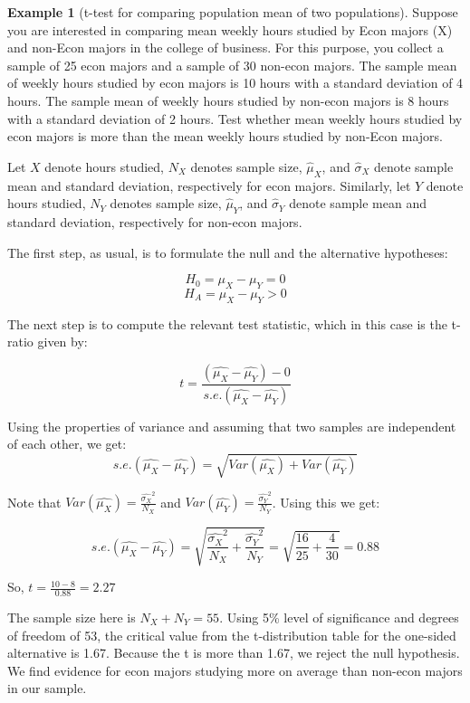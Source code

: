 \documentclass[
]{book}
\theoremstyle{definition}
\theoremstyle{definition}
\newtheorem{example}{Example}[chapter]
\theoremstyle{definition}
\theoremstyle{definition}
\theoremstyle{remark}
\begin{document}
\begin{example}[t-test for comparing population mean of two populations]
\protect\hypertarget{exm:unnamed-chunk-95}{}\label{exm:unnamed-chunk-95}Suppose you are interested in comparing mean weekly hours studied by Econ majors (X) and non-Econ majors in the college of business. For this purpose, you collect a sample of 25 econ majors and a sample of 30 non-econ majors. The sample mean of weekly hours studied by econ majors is 10 hours with a standard deviation of 4 hours. The sample mean of weekly hours studied by non-econ majors is 8 hours with a standard deviation of 2 hours. Test whether mean weekly hours studied by econ majors is more than the mean weekly hours studied by non-Econ majors.

Let \(X\) denote hours studied, \(N_X\) denotes sample size, \(\hat{\mu}_X\), and \(\hat{\sigma}_X\) denote sample mean and standard deviation, respectively for econ majors. Similarly, let \(Y\) denote hours studied, \(N_Y\) denotes sample size, \(\hat{\mu}_Y\), and \(\hat{\sigma}_Y\) denote sample mean and standard deviation, respectively for non-econ majors.

The first step, as usual, is to formulate the null and the alternative hypotheses:

\[H_0= \mu_X - \mu_Y = 0\]
\[H_A= \mu_X - \mu_Y > 0\]

The next step is to compute the relevant test statistic, which in this case is the t-ratio given by:

\[t= \frac{(\hat{\mu_X}-\hat{\mu_Y})-0}{s.e.(\hat{\mu_X}-\hat{\mu_Y})}\]

Using the properties of variance and assuming that two samples are independent of each other, we get:
\[s.e.(\hat{\mu_X}-\hat{\mu_Y})=\sqrt{Var(\hat{\mu_X})+Var(\hat{\mu_Y})}\]

Note that \(\displaystyle Var(\hat{\mu_X})= \frac{\widehat{\sigma_X}^2}{N_X}\) and \(\displaystyle Var(\hat{\mu_Y})= \frac{\widehat{\sigma_Y}^2}{N_Y}\). Using this we get:

\[s.e.(\hat{\mu_X}-\hat{\mu_Y})=\sqrt{\frac{\widehat{\sigma_X}^2}{N_X}+\frac{\widehat{\sigma_Y}^2}{N_Y}}=\sqrt{\frac{16}{25}+\frac{4}{30}}=0.88 \]

So, \(t=\displaystyle \frac{10-8}{0.88}=2.27\)

The sample size here is \(N_X+N_Y=55\). Using 5\% level of significance and degrees of freedom of 53, the critical value from the t-distribution table for the one-sided alternative is 1.67. Because the \textbar t\textbar{} is more than 1.67, we reject the null hypothesis. We find evidence for econ majors studying more on average than non-econ majors in our sample.
\end{example}
\end{document}
